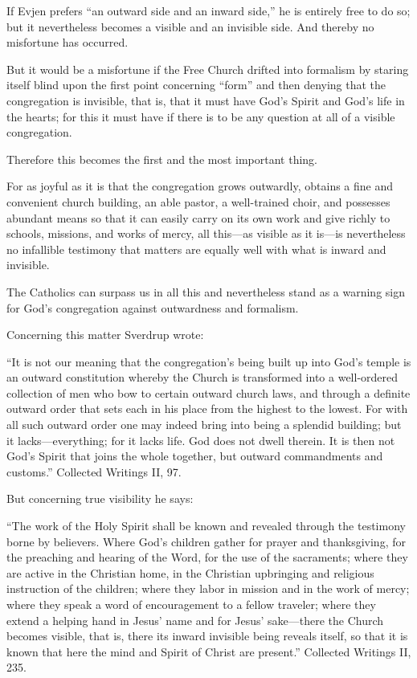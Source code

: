 If Evjen prefers “an outward side and an inward side,” he is entirely free to do so; but it nevertheless becomes a visible and an invisible side. And thereby no misfortune has occurred.

But it would be a misfortune if the Free Church drifted into formalism by staring itself blind upon the first point concerning “form” and then denying that the congregation is invisible, that is, that it must have God’s Spirit and God’s life in the hearts; for this it must have if there is to be any question at all of a visible congregation.

Therefore this becomes the first and the most important thing.

For as joyful as it is that the congregation grows outwardly, obtains a fine and convenient church building, an able pastor, a well-trained choir, and possesses abundant means so that it can easily carry on its own work and give richly to schools, missions, and works of mercy, all this—as visible as it is—is nevertheless no infallible testimony that matters are equally well with what is inward and invisible.

The Catholics can surpass us in all this and nevertheless stand as a warning sign for God’s congregation against outwardness and formalism.

Concerning this matter Sverdrup wrote:

“It is not our meaning that the congregation’s being built up into God’s temple is an outward constitution whereby the Church is transformed into a well-ordered collection of men who bow to certain outward church laws, and through a definite outward order that sets each in his place from the highest to the lowest. For with all such outward order one may indeed bring into being a splendid building; but it lacks—everything; for it lacks life. God does not dwell therein. It is then not God’s Spirit that joins the whole together, but outward commandments and customs.” Collected Writings II, 97.

But concerning true visibility he says:

“The work of the Holy Spirit shall be known and revealed through the testimony borne by believers. Where God’s children gather for prayer and thanksgiving, for the preaching and hearing of the Word, for the use of the sacraments; where they are active in the Christian home, in the Christian upbringing and religious instruction of the children; where they labor in mission and in the work of mercy; where they speak a word of encouragement to a fellow traveler; where they extend a helping hand in Jesus’ name and for Jesus’ sake—there the Church becomes visible, that is, there its inward invisible being reveals itself, so that it is known that here the mind and Spirit of Christ are present.” Collected Writings II, 235.

